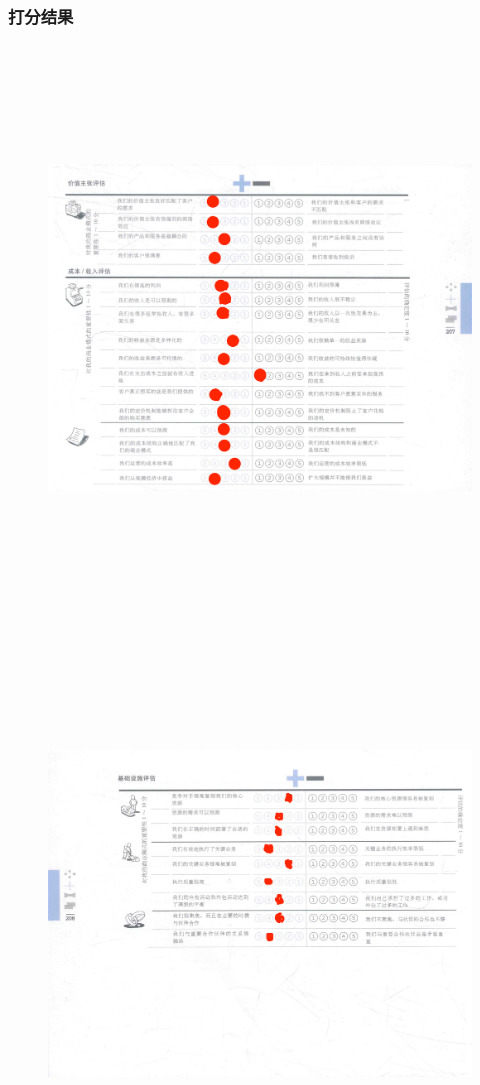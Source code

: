 \documentclass[a4paper,12pt]{article}
\begin{document}
    \subsubsection{打分结果}
    \begin{figure}[htbp]
        \centering
        \includegraphics[width=20cm,height=15cm]{png/S&W1}
    \end{figure}
    \begin{figure}[htbp]
        \centering
        \includegraphics[width=15cm,height=15cm]{png/S&W2}
    \end{figure}
   
\end{document}
